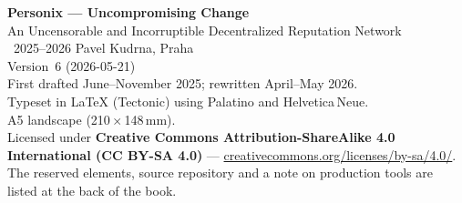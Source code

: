 \thispagestyle{empty}
\ifdefined\printmode\vspace*{\fill}\else{}\fi
\begin{flushleft}\small\sffamily
\textbf{Personix --- Uncompromising Change}\\[0.3em]
An Uncensorable and Incorruptible Decentralized Reputation Network\\[1.4em]

\textcopyright\ 2025--2026 Pavel Kudrna, Praha\\[0.4em]

Version~6 (2026-05-21)\\
First drafted June--November 2025; rewritten April--May 2026.\\[1.4em]

Typeset in \LaTeX{} (Tectonic) using Palatino and Helvetica\,Neue.\\
A5 landscape (210\,$\times$\,148\,mm).\\[1.4em]

Licensed under \textbf{Creative Commons Attribution-ShareAlike 4.0
International (CC BY-SA 4.0)} ---
\href{https://creativecommons.org/licenses/by-sa/4.0/}{creativecommons.org/licenses/by-sa/4.0/}.
The reserved elements, source repository and a note on production tools
are listed at the back of the book.
\end{flushleft}
\ifdefined\printmode\else{}\fi
\clearpage
